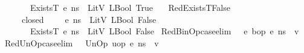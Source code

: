 \begin{isabellebody}
\ \ \ \ \ {\isasymLambda}{\isacharcomma}{\kern0pt}{\isasymGamma}{\isacharcomma}{\kern0pt}{\isasymOmega}\ {\isasymturnstile}\ {\isasymlangle}ExistsT\ e{\isacharcomma}{\kern0pt}\ n{\isacharunderscore}{\kern0pt}s{\isasymrangle}\ {\isasymDown}\ LitV\ {\isacharparenleft}{\kern0pt}LBool\ True{\isacharparenright}{\kern0pt}{\isachardoublequoteclose}\isanewline
\ \ {\isacharbar}{\kern0pt}\ RedExistsT{\isacharunderscore}{\kern0pt}False{\isacharcolon}{\kern0pt}\isanewline
\ \ \ \ {\isachardoublequoteopen}{\isasymlbrakk}{\isasymAnd}{\isasymtau}{\isachardot}{\kern0pt}\ closed\ {\isasymtau}\ {\isasymLongrightarrow}\ {\isasymLambda}{\isacharcomma}{\kern0pt}{\isasymGamma}{\isacharcomma}{\kern0pt}{\isacharparenleft}{\kern0pt}{\isasymtau}{\isacharhash}{\kern0pt}{\isasymOmega}{\isacharparenright}{\kern0pt}\ {\isasymturnstile}\ {\isasymlangle}e{\isacharcomma}{\kern0pt}\ n{\isacharunderscore}{\kern0pt}s{\isasymrangle}\ {\isasymDown}\ LitV\ {\isacharparenleft}{\kern0pt}LBool\ False{\isacharparenright}{\kern0pt}\ {\isasymrbrakk}\ {\isasymLongrightarrow}\isanewline
\ \ \ \ \ {\isasymLambda}{\isacharcomma}{\kern0pt}{\isasymGamma}{\isacharcomma}{\kern0pt}{\isasymOmega}\ {\isasymturnstile}\ {\isasymlangle}ExistsT\ e{\isacharcomma}{\kern0pt}\ n{\isacharunderscore}{\kern0pt}s{\isasymrangle}\ {\isasymDown}\ LitV\ {\isacharparenleft}{\kern0pt}LBool\ False{\isacharparenright}{\kern0pt}{\isachardoublequoteclose}\isanewline
\isanewline
{}\isamarkupfalse%
\ RedBinOp{\isacharunderscore}{\kern0pt}case{\isacharbrackleft}{\kern0pt}elim{\isacharbang}{\kern0pt}{\isacharbrackright}{\kern0pt}{\isacharcolon}{\kern0pt}\ {\isachardoublequoteopen}{\isasymLambda}{\isacharcomma}{\kern0pt}{\isasymGamma}{\isacharcomma}{\kern0pt}{\isasymOmega}\ {\isasymturnstile}\ {\isasymlangle}{\isacharparenleft}{\kern0pt}e{}\ {\isasymguillemotleft}bop{\isasymguillemotright}\ e{}{\isacharparenright}{\kern0pt}{\isacharcomma}{\kern0pt}\ n{\isacharunderscore}{\kern0pt}s{\isasymrangle}\ {\isasymDown}\ v{\isachardoublequoteclose}\isanewline
{}\isamarkupfalse%
\ RedUnOp{\isacharunderscore}{\kern0pt}case{\isacharbrackleft}{\kern0pt}elim{\isacharbang}{\kern0pt}{\isacharbrackright}{\kern0pt}{\isacharcolon}{\kern0pt}\ {\isachardoublequoteopen}{\isasymLambda}{\isacharcomma}{\kern0pt}{\isasymGamma}{\isacharcomma}{\kern0pt}{\isasymOmega}\ {\isasymturnstile}\ {\isasymlangle}UnOp\ uop\ e{}{\isacharcomma}{\kern0pt}\ n{\isacharunderscore}{\kern0pt}s{\isasymrangle}\ {\isasymDown}\ v{\isachardoublequoteclose}\isanewline

\end{isabellebody}
